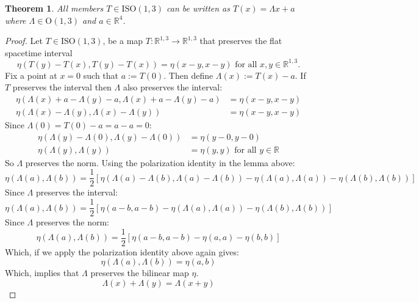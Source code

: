 \documentclass{amsart}
\newtheorem{theorem}{Theorem}[section]
\theoremstyle{definition}
\theoremstyle{remark}
\begin{document}
\begin{theorem}
  All members $T\in\mathrm{ISO}(1,3)$ can be written as $T(x)=\Lambda x + a$ where $\Lambda\in\mathrm{O}(1, 3)$ and $a\in\mathbb{R}^4$.
\end{theorem}
\begin{proof}
  Let $T\in\mathrm{ISO}(1,3)$, be a map $T:\mathbb{R}^{1,3}\to\mathbb{R}^{1,3}$ that preserves the flat spacetime interval
  \begin{equation*}
    \eta\left(T(y)-T(x),T(y)-T(x)\right)=\eta(x-y,x-y)\text{ for all }x,y \in\mathbb{R}^{1,3}. 
  \end{equation*}
  Fix a point at $x=0$ such that $a:=T(0)$. Then define $\Lambda(x):= T(x)-a$. If $T$ preserves the interval then $\Lambda$ also preserves the interval:
  \begin{align*}
    \eta(\Lambda(x)+a-\Lambda(y)-a,\Lambda(x)+a-\Lambda(y)-a)&= \eta(x-y,x-y)\\
    \eta(\Lambda(x)-\Lambda(y),\Lambda(x)-\Lambda(y)) &= \eta(x-y,x-y) 
  \end{align*}
  Since $\Lambda(0)=T(0)-a=a-a=0$:
  \begin{align*}
    \eta\left(\Lambda(y)-\Lambda(0),\Lambda(y)-\Lambda(0)\right) &= \eta(y-0,y-0)\\
    \eta(\Lambda(y),\Lambda(y)) &= \eta(y,y) \text{ for all } y \in\mathbb{R}
  \end{align*}
  So $\Lambda$ preserves the norm.
  Using the polarization identity in the lemma above:
  \begin{equation*}
    \eta(\Lambda(a),\Lambda(b)) = \frac{1}{2} \left[\eta(\Lambda(a)-\Lambda(b),\Lambda(a)-\Lambda(b)) - \eta(\Lambda(a),\Lambda(a)) - \eta(\Lambda(b),\Lambda(b))\right]
  \end{equation*}
  Since $\Lambda$ preserves the interval:
  \begin{equation*}
    \eta(\Lambda(a),\Lambda(b)) = \frac{1}{2} \left[\eta(a-b,a-b) - \eta(\Lambda(a),\Lambda(a)) - \eta(\Lambda(b),\Lambda(b))\right]
  \end{equation*}
  Since $\Lambda$ preserves the norm:
  \begin{equation*}
    \eta(\Lambda(a),\Lambda(b)) = \frac{1}{2} \left[\eta(a-b,a-b) - \eta(a,a) - \eta(b,b)\right]
  \end{equation*}
  Which, if we apply the polarization identity above again gives:
  \begin{equation*}
    \eta(\Lambda(a),\Lambda(b)) = \eta(a,b)
  \end{equation*}
  Which, implies that $\Lambda$ preserves the bilinear map $\eta$.
  \begin{equation*}
    \Lambda(x)+\Lambda(y)=\Lambda(x+y)
  \end{equation*}
\end{proof}
\end{document}
